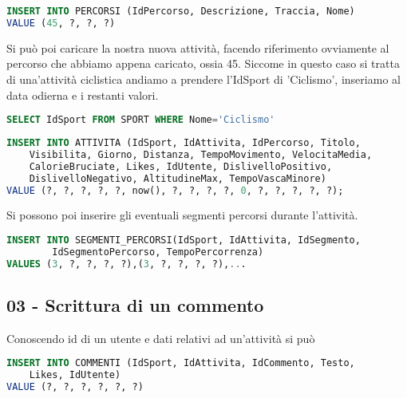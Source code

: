 \documentclass[12pt]{report}
\begin{document}
\begin{lstlisting}[style=sql, language=SQL, label=lst:sql-query]
INSERT INTO PERCORSI (IdPercorso, Descrizione, Traccia, Nome)
VALUE (45, ?, ?, ?)
\end{lstlisting}

Si può poi caricare la nostra nuova attività, facendo riferimento ovviamente al percorso
che abbiamo appena caricato, ossia 45. Siccome in questo caso si tratta di una'attività
ciclistica andiamo a prendere l'IdSport di 'Ciclismo', inseriamo al data odierna e i restanti valori.

\begin{lstlisting}[style=sql, language=SQL, label=lst:sql-query]
SELECT IdSport FROM SPORT WHERE Nome='Ciclismo'
\end{lstlisting}

\begin{lstlisting}[style=sql, language=SQL, label=lst:sql-query]
INSERT INTO ATTIVITA (IdSport, IdAttivita, IdPercorso, Titolo,
    Visibilita, Giorno, Distanza, TempoMovimento, VelocitaMedia,
    CalorieBruciate, Likes, IdUtente, DislivelloPositivo, 
    DislivelloNegativo, AltitudineMax, TempoVascaMinore)
VALUE (?, ?, ?, ?, ?, now(), ?, ?, ?, ?, 0, ?, ?, ?, ?, ?);
\end{lstlisting}

Si possono poi inserire gli eventuali segmenti percorsi durante l'attività.

\begin{lstlisting}[style=sql, language=SQL, label=lst:sql-query]
INSERT INTO SEGMENTI_PERCORSI(IdSport, IdAttivita, IdSegmento, 
        IdSegmentoPercorso, TempoPercorrenza) 
VALUES (3, ?, ?, ?, ?),(3, ?, ?, ?, ?),...
\end{lstlisting}

\subsection*{03 - Scrittura di un commento}
Conoscendo id di un utente e dati relativi ad un'attività si può

\begin{lstlisting}[style=sql, language=SQL, label=lst:sql-query]
INSERT INTO COMMENTI (IdSport, IdAttivita, IdCommento, Testo,
    Likes, IdUtente)
VALUE (?, ?, ?, ?, ?, ?)
\end{lstlisting}
\end{document}
